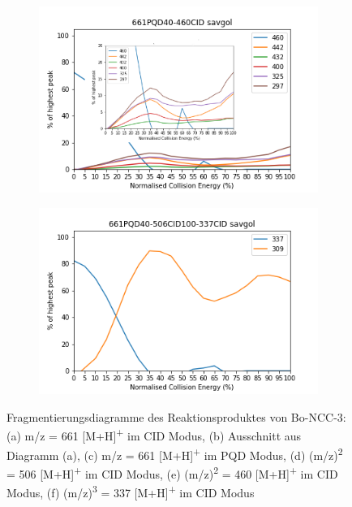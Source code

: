 \begin{figure}[!htbp]
  \begin{subfigure}[b]{0.5\textwidth}
    \includegraphics[width=\textwidth]{content/Anhang/ESIMS/RP_Bo-NCC-3/661PQD40-460CID-460savgol_pic.png}
    \caption{}
  \end{subfigure}
  \hfill
  \begin{subfigure}[b]{0.5\textwidth}
    \includegraphics[width=\textwidth]{content/Anhang/ESIMS/RP_Bo-NCC-3/661PQD40-506CID100-337CID-337savgol.png}
    \caption{}
  \end{subfigure}
  
  \caption[Fragmentierungsdiagramme des Reaktionsproduktes von Bo-NCC-3, Quelle: Autor]{Fragmentierungsdiagramme des Reaktionsproduktes von Bo-NCC-3: (a) m/z = 661 [M+H]\textsuperscript{+} im CID Modus, (b) Ausschnitt aus Diagramm (a), (c) m/z = 661 [M+H]\textsuperscript{+} im PQD Modus, (d) (m/z)\textsuperscript{2} = 506 [M+H]\textsuperscript{+} im CID Modus, (e) (m/z)\textsuperscript{2} = 460 [M+H]\textsuperscript{+} im CID Modus, (f) (m/z)\textsuperscript{3} = 337 [M+H]\textsuperscript{+} im CID Modus}
\end{figure}
